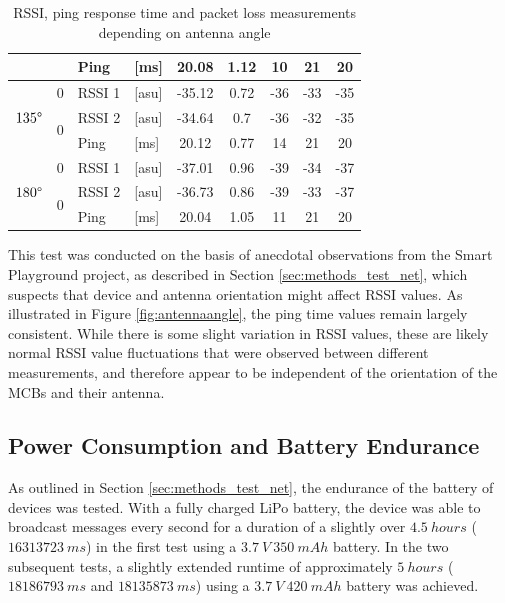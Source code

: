 \begin{table}[H]
\begin{tabular}{|c|c|l|l|c|c|c|c|c|}
        && Ping & [ms] & 20.08 & 1.12 & 10 & 21 & 20 \\\hline\hline
        \multirow{3}{*}{$135\degree$} & \multirow{1}{*}{0} & RSSI 1 & [asu] & -35.12 & 0.72 & -36 & -33 & -35 \\\cline{2-9}%
        & \multirow{2}{*}{0} & RSSI 2 & [asu] & -34.64 & 0.7 & -36 & -32 & -35 \\\cline{3-9}
        && Ping & [ms] & 20.12 & 0.77 & 14 & 21 & 20 \\\hline\hline
        \multirow{3}{*}{$180\degree$} & \multirow{1}{*}{0} & RSSI 1 & [asu] & -37.01 & 0.96 & -39 & -34 & -37 \\\cline{2-9}%
        & \multirow{2}{*}{0} & RSSI 2 & [asu] & -36.73 & 0.86 & -39 & -33 & -37 \\\cline{3-9}
        && Ping & [ms] & 20.04 & 1.05 & 11 & 21 & 20 \\\hline
    \end{tabular}
    \vspace{\ftspace}
    \caption{RSSI, ping response time and packet loss measurements depending on antenna angle}
    \label{tab:angle_res}
\end{table}

This test was conducted on the basis of anecdotal observations from the Smart Playground project, as described in Section \ref{sec:methods_test_net}, which suspects that device and antenna orientation might affect RSSI values. As illustrated in Figure \ref{fig:antennaangle}, the ping time values remain largely consistent. While there is some slight variation in RSSI values, these are likely normal RSSI value fluctuations that were observed between different measurements, and therefore appear to be independent of the orientation of the MCBs and their antenna.

\subsection{\label{sec:res_battery}Power Consumption and Battery Endurance}

As outlined in Section \ref{sec:methods_test_net}, the endurance of the battery of devices was tested. With a fully charged LiPo battery, the device was able to broadcast messages every second for a duration of a slightly over $4.5\ hours$ ($16313723\ ms$) in the first test using a $3.7\ V\  350\ mAh$ battery. In the two subsequent tests, a slightly extended runtime of approximately $5\ hours$ ($18186793\ ms$ and $18135873\ ms$) using a $3.7\ V\  420\ mAh$ battery was achieved. %

